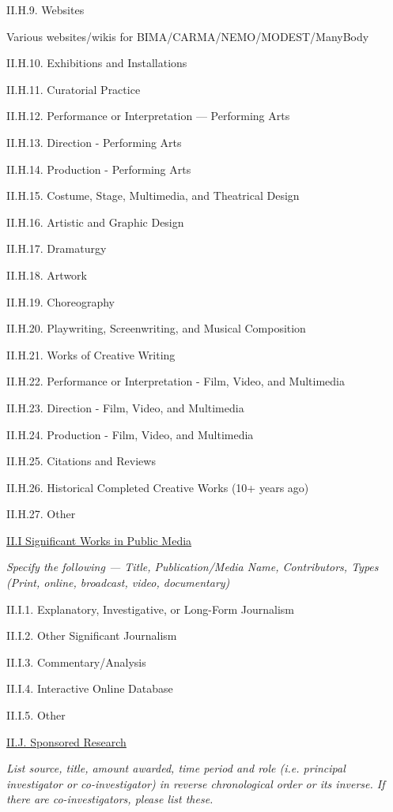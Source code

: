 \documentclass[11pt,letterpaper]{article}
\begin{document}
II.H.9. Websites

Various websites/wikis for BIMA/CARMA/NEMO/MODEST/ManyBody

II.H.10. Exhibitions and Installations

II.H.11. Curatorial Practice

II.H.12. Performance or Interpretation --- Performing Arts

II.H.13. Direction - Performing Arts

II.H.14. Production - Performing Arts

II.H.15. Costume, Stage, Multimedia, and Theatrical Design

II.H.16. Artistic and Graphic Design

II.H.17. Dramaturgy

II.H.18. Artwork

II.H.19. Choreography

II.H.20. Playwriting, Screenwriting, and Musical Composition

II.H.21. Works of Creative Writing

II.H.22. Performance or Interpretation - Film, Video, and Multimedia

II.H.23. Direction - Film, Video, and Multimedia

II.H.24. Production - Film, Video, and Multimedia

II.H.25. Citations and Reviews

II.H.26. Historical Completed Creative Works (10+ years ago)

II.H.27. Other


\underline{II.I Significant Works in Public Media}

\textit{Specify the following --- Title, Publication/Media Name, Contributors, Types (Print, online, broadcast, video, documentary)}

II.I.1. Explanatory, Investigative, or Long-Form Journalism

II.I.2. Other Significant Journalism

II.I.3. Commentary/Analysis

II.I.4. Interactive Online Database

II.I.5. Other


\underline{II.J. Sponsored Research}

\textit{List source, title, amount awarded, time period and role (i.e. principal investigator or co-investigator) in reverse chronological order or its inverse.  If there are co-investigators, please list these.}
\end{document}
